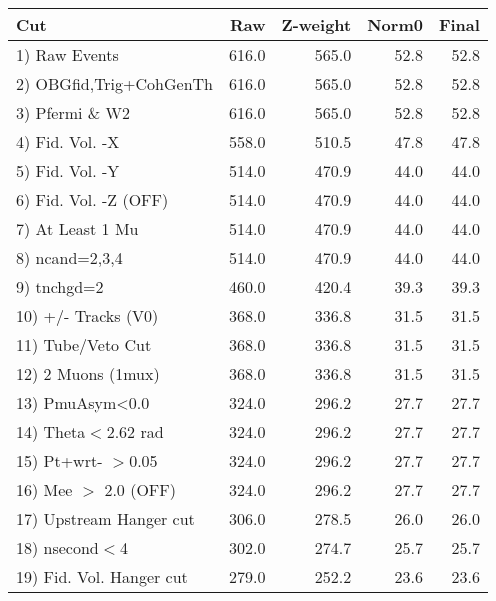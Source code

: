  \begin{table}[h!]\centering
 \begin{tabular}{||l||r|r|r|r||}
 \hline
 \hline
 Cut & Raw & Z-weight & Norm0 & Final \\
 \hline
  1) Raw Events           &       616.0 &       565.0 &        52.8 &        52.8 \\
  2) OBGfid,Trig+CohGenTh &       616.0 &       565.0 &        52.8 &        52.8 \\
  3) Pfermi \& W2         &       616.0 &       565.0 &        52.8 &        52.8 \\
  4) Fid. Vol. -X         &       558.0 &       510.5 &        47.8 &        47.8 \\
  5) Fid. Vol. -Y         &       514.0 &       470.9 &        44.0 &        44.0 \\
  6) Fid. Vol. -Z (OFF)   &       514.0 &       470.9 &        44.0 &        44.0 \\
  7) At Least 1 Mu        &       514.0 &       470.9 &        44.0 &        44.0 \\
  8) ncand=2,3,4          &       514.0 &       470.9 &        44.0 &        44.0 \\
  9) tnchgd=2             &       460.0 &       420.4 &        39.3 &        39.3 \\
 10) +/- Tracks (V0)      &       368.0 &       336.8 &        31.5 &        31.5 \\
 11) Tube/Veto Cut        &       368.0 &       336.8 &        31.5 &        31.5 \\
 12) 2 Muons (1mux)       &       368.0 &       336.8 &        31.5 &        31.5 \\
 13) PmuAsym<0.0          &       324.0 &       296.2 &        27.7 &        27.7 \\
 14) Theta$<$2.62 rad     &       324.0 &       296.2 &        27.7 &        27.7 \\
 15) Pt+wrt- $>$0.05      &       324.0 &       296.2 &        27.7 &        27.7 \\
 16) Mee $>$ 2.0  (OFF)   &       324.0 &       296.2 &        27.7 &        27.7 \\
 17) Upstream Hanger cut  &       306.0 &       278.5 &        26.0 &        26.0 \\
 18) nsecond$<$4          &       302.0 &       274.7 &        25.7 &        25.7 \\
 19) Fid. Vol. Hanger cut &       279.0 &       252.2 &        23.6 &        23.6 \\

\end{tabular}
\end{table}
